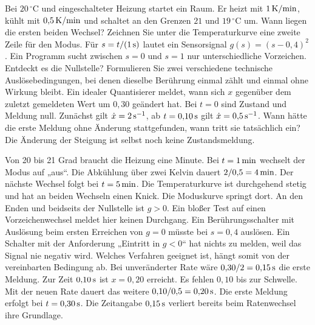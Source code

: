 Bei \(20\,^\circ\mathrm C\) und eingeschalteter Heizung startet ein Raum. Er heizt mit \(1\,\mathrm{K/min}\), kühlt mit \(0{,}5\,\mathrm{K/min}\) und schaltet an den Grenzen \(21\) und \(19\,^\circ\mathrm C\) um. Wann liegen die ersten beiden Wechsel? Zeichnen Sie unter die Temperaturkurve eine zweite Zeile für den Modus.
Für \(s=t/(1\,\mathrm{s})\) lautet ein Sensorsignal \(g(s)=(s-0{,}4)^2\). Ein Programm sucht zwischen \(s=0\) und \(s=1\) nur unterschiedliche Vorzeichen. Entdeckt es die Nullstelle? Formulieren Sie zwei verschiedene technische Auslösebedingungen, bei denen dieselbe Berührung einmal zählt und einmal ohne Wirkung bleibt.
Ein idealer Quantisierer meldet, wann sich \(x\) gegenüber dem zuletzt gemeldeten Wert um \(0{,}30\) geändert hat. Bei \(t=0\) sind Zustand und Meldung null. Zunächst gilt \(\dot x=2\,\mathrm{s^{-1}}\), ab \(t=0{,}10\,\mathrm{s}\) gilt \(\dot x=0{,}5\,\mathrm{s^{-1}}\). Wann hätte die erste Meldung ohne Änderung stattgefunden, wann tritt sie tatsächlich ein? Die Änderung der Steigung ist selbst noch keine Zustandsmeldung.

\schreibfeld



Von 20 bis 21 Grad braucht die Heizung eine Minute. Bei \(t=1\,\mathrm{min}\) wechselt der Modus auf „aus“. Die Abkühlung über zwei Kelvin dauert \(2/0{,}5=4\,\mathrm{min}\). Der nächste Wechsel folgt bei \(t=5\,\mathrm{min}\). Die Temperaturkurve ist durchgehend stetig und hat an beiden Wechseln einen Knick. Die Moduskurve springt dort.
An den Enden und beidseits der Nullstelle ist \(g>0\). Ein bloßer Test auf einen Vorzeichenwechsel meldet hier keinen Durchgang. Ein Berührungsschalter mit Auslösung beim ersten Erreichen von \(g=0\) müsste bei \(s=0{,}4\) auslösen. Ein Schalter mit der Anforderung „Eintritt in \(g<0\)“ hat nichts zu melden, weil das Signal nie negativ wird. Welches Verfahren geeignet ist, hängt somit von der vereinbarten Bedingung ab.
Bei unveränderter Rate wäre \(0{,}30/2=0{,}15\,\mathrm{s}\) die erste Meldung. Zur Zeit \(0{,}10\,\mathrm{s}\) ist \(x=0{,}20\) erreicht. Es fehlen \(0{,}10\) bis zur Schwelle. Mit der neuen Rate dauert das weitere \(0{,}10/0{,}5=0{,}20\,\mathrm{s}\). Die erste Meldung erfolgt bei \(t=0{,}30\,\mathrm{s}\). Die Zeitangabe \(0{,}15\,\mathrm{s}\) verliert bereits beim Ratenwechsel ihre Grundlage.

